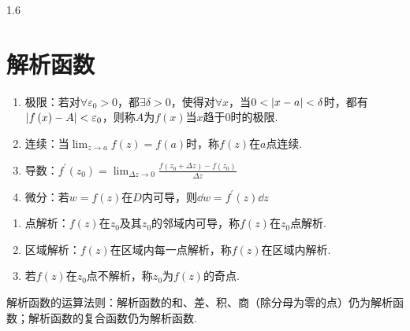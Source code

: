 \documentclass[lang=cn,10pt]{elegantbook}
\begin{document}
\begin{spacing}{1.6}
\chapter{解析函数}
\begin{definition}
\begin{enumerate}
    \item 极限：若对$\forall\varepsilon_0>0$，都$\exists\delta>0$，使得对$\forall x$，当$0<\abs{x-a}<\delta$时，都有$\abs{f\left(x\right)-A}<\varepsilon_0$，则称$A$为$f\left(x\right)$当$x$趋于$0$时的极限.
    \item 连续：当$\lim_{z\to a}f\left(z\right)=f\left(a\right)$时，称$f\left(z\right)$在$a$点连续.
    \item 导数：$f^{\prime}\left(z_0\right)=\lim_{\Delta z\to 0}\frac{f\left(z_0+\Delta z\right)-f\left(z_0\right)}{\Delta z}$
    \item 微分：若$w=f\left(z\right)$在$D$内可导，则$\dd w=f^{\prime}\left(z\right)\dd z$
\end{enumerate}
\end{definition}
\begin{definition}
\begin{enumerate}
    \item 点解析：$f\left(z\right)$在$z_0$及其$z_0$的邻域内可导，称$f\left(z\right)$在$z_0$点解析.
    \item 区域解析：$f\left(z\right)$在区域内每一点解析，称$f\left(z\right)$在区域内解析.
    \item 若$f\left(z\right)$在$z_0$点不解析，称$z_0$为$f\left(z\right)$的奇点.
\end{enumerate}
\end{definition}
\begin{theorem}
解析函数的运算法则：解析函数的和、差、积、商（除分母为零的点）仍为解析函数；解析函数的复合函数仍为解析函数.
\end{theorem}

\end{spacing}
\end{document}

